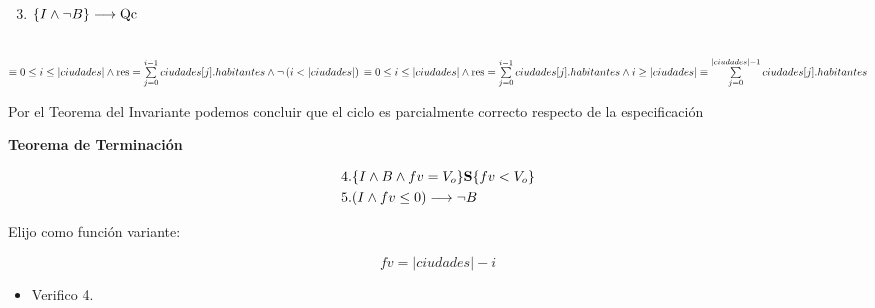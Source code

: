 \documentclass[10pt,a4paper]{article}
\begin{document}
\begin{enumerate}
	\setcounter{enumi}{2}  %
	\item ${\{I \land  \neg B\}} \longrightarrow\text{Qc}$

\end{enumerate}

 \\
$\equiv 0 \leq i \leq |ciudades| \land \text{res} = \sum\limits_{j=0}^{i-1}ciudades[j].habitantes \wedge \neg \left( i<|ciudades| \right) \\
	\equiv 0 \leq i \leq |ciudades| \land \text{res} = \sum\limits_{j=0}^{i-1}ciudades[j].habitantes \wedge i \geq|ciudades| \\
	\equiv \sum\limits_{j=0}^{|ciudades|-1}ciudades[j].habitantes$

Por el Teorema del Invariante podemos concluir que el ciclo es parcialmente
correcto respecto de la especificación

\textbf{Teorema de Terminación}

\begin{equation}
	\begin{align}
		4. & \{ I \wedge B \wedge fv= V_{o} \} \textbf{S} \{fv < V_{o} \} \\
		5. & ( I \wedge fv \leq 0) \longrightarrow \neg B
	\end{align}
\end{equation}

Elijo como función variante:

\begin{equation}
	{fv}= |ciudades| -i
\end{equation}

\begin{itemize}
	\item Verifico 4.
\end{itemize}
\end{document}
